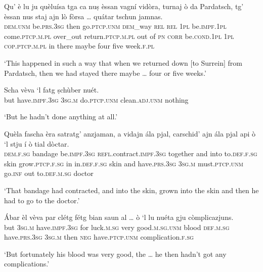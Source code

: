 \begin{linenumbers}
\gll  Qu' è lu ju quèluísa tga ca nuṣ èssan vagní vidòra, turnaj ò da Pardatsch, tg' èssan nus staj ajn lò fòrsa … quátar tschun jamnas.  \\
 \textsc{dem.unm} be.\textsc{prs.3sg} then go.\textsc{ptcp.unm} \textsc{dem}\_way \textsc{rel} \textsc{rel} \textsc{1pl} be.\textsc{impf.1pl} come.\textsc{ptcp.m.pl} over\_out return.\textsc{ptcp.m.pl} out of \textsc{pn} \textsc{corr} be.\textsc{cond.1pl} \textsc{1pl} \textsc{cop.ptcp.m.pl} in there maybe {} four five week.\textsc{f.pl}   \\
\end{linenumbers}
\medskip
\glt `This happened in such a way that when we returned down [to Surrein] from Pardatsch, then we had stayed there maybe … four or five weeks.'
\medskip

\begin{linenumbers}
\gll  Scha vèva `l fatg ṣchùber nuét.  \\
but have.\textsc{impf.3sg} \textsc{3sg.m} do.\textsc{ptcp.unm} clean.\textsc{adj.unm} nothing \\
\end{linenumbers}
\medskip
\glt `But he hadn’t done anything at all.'
\medskip

\begin{linenumbers}
\gll Quèla fascha èra satratg’ anzjaman, a vidajn ála pjal, carschid’ ajn ála pjal api ò `l stju í ò tial dòctar.  \\
\textsc{dem.f.sg} bandage be.\textsc{impf.3sg} \textsc{refl.}contract.\textsc{impf.3sg} together and into to.\textsc{def.f.sg} skin grow.\textsc{ptcp.f.sg} in in.\textsc{def.f.sg} skin and have.\textsc{prs.3sg} \textsc{3sg.m} must.\textsc{ptcp.unm} go.\textsc{inf} out to.\textsc{def.m.sg} doctor \\
\end{linenumbers}
\medskip
\glt `That bandage had contracted, and into the skin, grown into the skin and then he had to go to the doctor.'
\medskip

\begin{linenumbers}
\gll  Ábar èl vèva par clétg fétg bian saun al … ò `l lu nuéta gju còmplicazjuns.  \\
but  \textsc{3sg.m} have.\textsc{impf.3sg} for luck.\textsc{m.sg} very good.\textsc{m.sg.unm} blood \textsc{def.m.sg} {} have.\textsc{prs.3sg} \textsc{3sg.m} then \textsc{neg} have.\textsc{ptcp.unm} complication.\textsc{f.sg}\\
\end{linenumbers}
\medskip
\glt `But fortunately his blood was very good, the … he then hadn’t got any complications.'
\medskip

